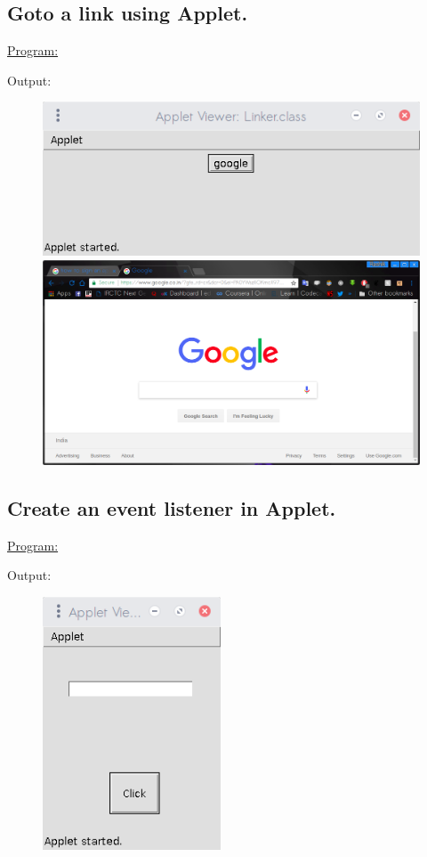 \documentclass[a4paper,11pt]{article}
\begin{document}
\bigskip

\subsection{Goto a link using Applet.}
\underline{Program:}


Output:
\begin{figure}[H]
\centering
\includegraphics[width=350pt,height=\textheight,keepaspectratio]{../assign2/pics/5.png}
\includegraphics[width=350pt,height=\textheight,keepaspectratio]{../assign2/pics/5-1.png}
\end{figure}

\bigskip

\subsection{Create an event listener in Applet.}
\underline{Program:}


Output:
\begin{figure}[H]
\centering
\includegraphics[width=150pt,height=\textheight,keepaspectratio]{../assign2/pics/6.png}
\end{figure}
\end{document}
